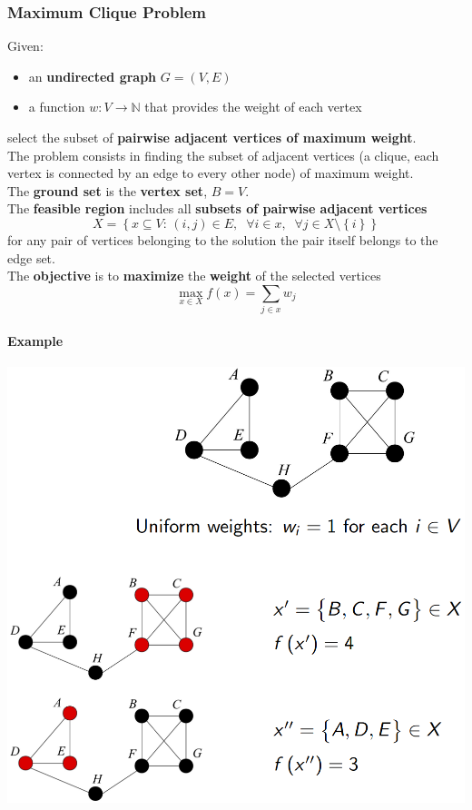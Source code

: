 \newpage

\subsubsection{Maximum Clique Problem}
Given:
\begin{itemize}
	\item an \textbf{undirected graph} $G = (V , E )$
	\item a function $w : V \rightarrow \mathbb{N}$ that provides the weight of each vertex
\end{itemize}
select the subset of \textbf{pairwise adjacent vertices of maximum weight}.\\
The problem consists in finding the subset of adjacent vertices (a clique, each vertex is connected by an edge to every other node) of maximum weight.\\

The \textbf{ground set} is the \textbf{vertex set}, $B = V$.\\

The \textbf{feasible region} includes all \textbf{subsets of pairwise adjacent vertices}
$$ X = \left\{x \subseteq V : \, (i,j) \in E, \;\; \forall i \in x, \;\; \forall j \in X \setminus \left\{i\right\}\right\}$$
for any pair of vertices belonging to the solution the pair itself belongs to the edge set.\\

The \textbf{objective} is to \textbf{maximize} the \textbf{weight} of the selected vertices
$$ \max_{x \in X} f(x) = \sum_{j \in x} w_j $$

\newpage

\paragraph{Example}
\begin{center}
	\includegraphics[width=\columnwidth]{img/MCP1}
\end{center}

